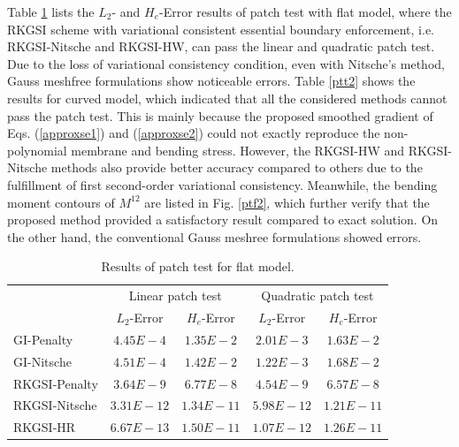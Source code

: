 Table \ref{ptt1} lists the $L_2$- and $H_e$-Error results of patch test with flat model, where the RKGSI scheme with variational consistent essential boundary enforcement, i.e. RKGSI-Nitsche and RKGSI-HW, can pass the linear and quadratic patch test. \DIFaddbegin {}\DIFaddend Due to the loss of variational consistency condition, even with Nitsche's method, Gauss meshfree formulations show noticeable errors. Table \ref{ptt2} shows the results for curved model, which indicated that all the considered methods cannot pass the patch test. This is mainly because the proposed smoothed gradient of Eqs. (\ref{approxse1}) and (\ref{approxse2}) could not exactly reproduce the non-polynomial membrane and bending stress. However, the RKGSI-HW and RKGSI-Nitsche methods also provide better accuracy compared to others due to the fulfillment of first second-order variational consistency. \DIFaddbegin {}\DIFaddend Meanwhile, the bending moment contours of $M^{12}$ are listed in Fig. \ref{ptf2}, which further verify that the proposed method provided a satisfactory result compared to exact solution. On the other hand, the \DIFaddbegin {}\DIFaddend conventional Gauss meshree formulations showed errors.

\begin{table}[!ht]
\centering
\caption{Results of patch test for flat model.}\label{ptt1}
\begin{tabular}{lcccc}
\toprule
 & \multicolumn{2}{c}{Linear patch test} & \multicolumn{2}{c}{Quadratic patch test} \\ \cline{2-5}
 & $L_2$-Error & $H_e$-Error & $L_2$-Error & $H_e$-Error \\
    \midrule
    GI-Penalty & $4.45E-4$ & $1.35E-2$ & $2.01E-3$ & $1.63E-2$ \\
    GI-Nitsche & $4.51E-4$ & $1.42E-2$ & $1.22E-3$ & $1.68E-2$ \\
    RKGSI-Penalty & $3.64E-9$ & $6.77E-8$ & $4.54E-9$ & $6.57E-8$ \\
    RKGSI-Nitsche & $3.31E-12$ & $1.34E-11$ & $5.98E-12$ & $1.21E-11$ \\
    RKGSI-HR & $6.67E-13$ & $1.50E-11$ & $1.07E-12$ & $1.26E-11$ \\
    \bottomrule
\end{tabular}
\end{table}

